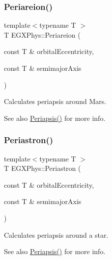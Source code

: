 \mbox{\label{group___periapsis_ga0617ba07a30b0fd0544c02f691bfae26}} 
\subsubsection{\texorpdfstring{Periareion()}{Periareion()}}
{\footnotesize\ttfamily template$<$typename T $>$ \\
T E\+G\+X\+Phys\+::\+Periareion (\begin{DoxyParamCaption}\item[{const T \&}]{orbital\+Eccentricity,  }\item[{const T \&}]{semimajor\+Axis }\end{DoxyParamCaption})}



Calculates periapsis around Mars. 

\begin{DoxySeeAlso}{See also}
\hyperlink{group___periapsis_ga4414ac75539371ec874a3d25cad6c9fe}{Periapsis()} for more info. 
\end{DoxySeeAlso}
\mbox{\label{group___periapsis_ga477de6824cbb5986cdae923141e21648}} 
\subsubsection{\texorpdfstring{Periastron()}{Periastron()}}
{\footnotesize\ttfamily template$<$typename T $>$ \\
T E\+G\+X\+Phys\+::\+Periastron (\begin{DoxyParamCaption}\item[{const T \&}]{orbital\+Eccentricity,  }\item[{const T \&}]{semimajor\+Axis }\end{DoxyParamCaption})}



Calculates periapsis around a star. 

\begin{DoxySeeAlso}{See also}
\hyperlink{group___periapsis_ga4414ac75539371ec874a3d25cad6c9fe}{Periapsis()} for more info. 
\end{DoxySeeAlso}
\mbox{\label{group___periapsis_gada5892309279a3a687c4eb2f88238e4e}} 
